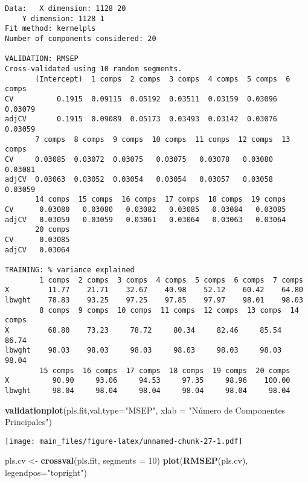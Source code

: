 \documentclass[]{article}
\newenvironment{Shaded}{\begin{snugshade}}{\end{snugshade}}
\newcommand{\KeywordTok}[1]{\textcolor[rgb]{0.13,0.29,0.53}{\textbf{#1}}}
\newcommand{\DataTypeTok}[1]{\textcolor[rgb]{0.13,0.29,0.53}{#1}}
\newcommand{\DecValTok}[1]{\textcolor[rgb]{0.00,0.00,0.81}{#1}}
\newcommand{\StringTok}[1]{\textcolor[rgb]{0.31,0.60,0.02}{#1}}
\newcommand{\NormalTok}[1]{#1}
\begin{document}
\begin{verbatim}
Data:   X dimension: 1128 20 
    Y dimension: 1128 1
Fit method: kernelpls
Number of components considered: 20

VALIDATION: RMSEP
Cross-validated using 10 random segments.
       (Intercept)  1 comps  2 comps  3 comps  4 comps  5 comps  6 comps
CV          0.1915  0.09115  0.05192  0.03511  0.03159  0.03096  0.03079
adjCV       0.1915  0.09089  0.05173  0.03493  0.03142  0.03076  0.03059
       7 comps  8 comps  9 comps  10 comps  11 comps  12 comps  13 comps
CV     0.03085  0.03072  0.03075   0.03075   0.03078   0.03080   0.03081
adjCV  0.03063  0.03052  0.03054   0.03054   0.03057   0.03058   0.03059
       14 comps  15 comps  16 comps  17 comps  18 comps  19 comps
CV      0.03080   0.03080   0.03082   0.03085   0.03084   0.03085
adjCV   0.03059   0.03059   0.03061   0.03064   0.03063   0.03064
       20 comps
CV      0.03085
adjCV   0.03064

TRAINING: % variance explained
        1 comps  2 comps  3 comps  4 comps  5 comps  6 comps  7 comps
X         11.77    21.71    32.67    40.98    52.12    60.42    64.80
lbwght    78.83    93.25    97.25    97.85    97.97    98.01    98.03
        8 comps  9 comps  10 comps  11 comps  12 comps  13 comps  14 comps
X         68.80    73.23     78.72     80.34     82.46     85.54     86.74
lbwght    98.03    98.03     98.03     98.03     98.03     98.03     98.04
        15 comps  16 comps  17 comps  18 comps  19 comps  20 comps
X          90.90     93.06     94.53     97.35     98.96    100.00
lbwght     98.04     98.04     98.04     98.04     98.04     98.04
\end{verbatim}

\begin{Shaded}
\begin{Highlighting}[]
\KeywordTok{validationplot}\NormalTok{(pls.fit,}\DataTypeTok{val.type=}\StringTok{"MSEP"}\NormalTok{, }\DataTypeTok{xlab =} \StringTok{"Número de Componentes Principales"}\NormalTok{)}
\end{Highlighting}
\end{Shaded}

\texttt{[image: main\_files/figure-latex/unnamed-chunk-27-1.pdf]}

\begin{Shaded}
\begin{Highlighting}[]
\NormalTok{pls.cv <-}\StringTok{ }\KeywordTok{crossval}\NormalTok{(pls.fit, }\DataTypeTok{segments =} \DecValTok{10}\NormalTok{)}
\KeywordTok{plot}\NormalTok{(}\KeywordTok{RMSEP}\NormalTok{(pls.cv), }\DataTypeTok{legendpos=}\StringTok{"topright"}\NormalTok{)}
\end{Highlighting}
\end{Shaded}
\end{document}
